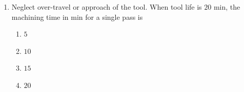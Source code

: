 \documentclass[journal,12pt,twocolumn]{IEEEtran}
\theoremstyle{remark}
\begin{document}
\begin{enumerate}[start=69]
    \item Neglect over-travel or approach of the tool. When tool life is $20$ min, the machining time in min for a single pass is
    \begin{enumerate}
       \item  $5$
        \item $10$ 
        \item $15$ 
        \item $20$
    \end{enumerate}
\end{enumerate}
\end{document}
